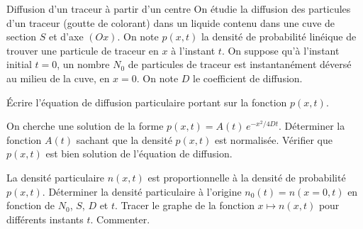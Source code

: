
\begin{exo}[PC][3][python]{Diffusion d’un traceur à partir d’un centre}
  On étudie la diffusion des particules d’un traceur (goutte de colorant) dans un liquide contenu dans une cuve de section $S$ et d’axe $(Ox)$. On note $p(x,t)$ la densité de probabilité linéique de trouver une particule de traceur en $x$ à l’instant $t$. On suppose qu’à l’instant initial $t=0$, un nombre $N_0$ de particules de traceur est instantanément déversé au milieu de la cuve, en $x=0$. On note $D$ le coefficient de diffusion.

  \begin{quest}
    \item Écrire l’équation de diffusion particulaire portant sur la fonction $p(x,t)$.
    \item On cherche une solution de la forme $p(x,t)= A(t) \, e^{-x^2/4Dt}$. Déterminer la fonction $A(t)$ sachant que la densité $p(x,t)$ est normalisée. Vérifier que $p(x,t)$ est bien solution de l’équation de diffusion.
    \item La densité particulaire $n(x,t)$ est proportionnelle à la densité de probabilité $p(x,t)$. Déterminer la densité particulaire à l'origine $n_0(t) = n(x=0,t)$ en fonction de $N_0$, $S$, $D$ et $t$. Tracer le graphe de la fonction $x \mapsto n(x,t)$ pour différents instants $t$. Commenter.
\end{quest}
\end{exo}

